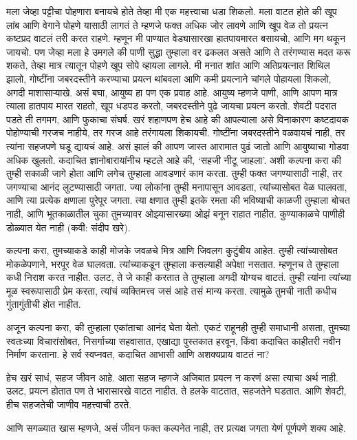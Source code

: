 मला जेव्हा पट्टीचा पोहणारा बनायचे होते तेव्हा मी एक महत्त्वाचा धडा शिकलो.  मला वाटत होते की खूप लांब आणि वेगाने पोहणे यासाठी लागतं ते म्हणजे फक्त अधिक जोर लावणे आणि खूप वेळ तो प्रयत्न कष्टप्रद वाटलं तरी करत राहणे. म्हणून मी पाण्यात वेड्यासारखा हातपायमारत बसायचो, आणि मग थकून जायचो. पण जेव्हा मला हे उमगले की पाणी सुद्धा  तुम्हाला वर ढकलत असते आणि ते तरंगण्यास मदत करू शकते, तेव्हा मात्र त्यातून पोहणे खूप सोपे व्हायला लागले. मी मनात शांत आणि अतिप्रयत्नात शिथिल झालो, गोष्टींना जबरदस्तीने करण्याचा प्रयत्न थांबवला आणि कमी प्रयत्नाने चांगले पोहायला शिकलो, अगदी माशासाऱ्याखे. 
असं बघा, आयुष्य हा पण एक प्रवाह आहे. आयुष्य म्हणजे पाणी, आणि आपण मात्र त्याला हातपाय मारत राहतो, खूप धडपड करतो, जबरदस्तीने पुढे जायचा प्रयत्न करतो. शेवटी पदरात पडते  ती तगमग, आणि फुकाचा संघर्ष. खरं शहाणपण हेच आहे की आपल्याला असे विनाकारण कष्टदायक पोहोण्याची गरजच नाहीये, तर गरज आहे तरंगायला शिकायची. गोष्टींना जबरदस्तीने वळवायचं नाही, तर त्यांना सहजपणे घडू द्यायचं आहे. असं झालं की आपण जास्त आरामात पुढं जातो आणि आयुष्याचा गोडवा अधिक खुलतो. कदाचित ज्ञानोबारायांनीच म्हटले आहे की, ‘सहजी नीटू जाहला’. 
अशी कल्पना करा की तुम्ही सकाळी जागे होता आणि लगेच तुम्हाला आवडणारं काम करता. तुम्ही फक्त जगण्यासाठी नाही, तर जगण्याचा आनंद लुटण्यासाठी जगता. ज्या लोकांना तुम्ही मनापासून आवडता, त्यांच्यासोबत वेळ घालवता, आणि त्या प्रत्येक क्षणाला पुरेपूर जगता. त्या क्षणात तुम्ही इतके रमता की भविष्याची काळजी तुम्हाला बोचत नाही, आणि भूतकाळातील चुका तुमच्यावर ओझ्यासारख्या ओझं बनून राहात नाहीत. कुण्याकाळचे पाणीही डोळ्यात येत नाही (कवी: संदीप खरे). 

कल्पना करा, तुमच्याकडे काही मोजके जवळचे मित्र आणि जिवलग कुटुंबीय आहेत. तुम्ही त्यांच्यासोबत मोकळेपणाने, भरपूर वेळ घालवता. त्यांच्याकडून तुम्हाला कसल्याही अपेक्षा नसतात. म्हणूनच ते तुम्हाला कधी निराश करत नाहीत. उलट, ते जे काही करतात ते तुम्हाला अगदी योग्यच वाटतं. तुम्ही त्यांना त्यांच्या मूळ स्वरूपासाठी प्रेम करता, त्यांचं व्यक्तिमत्त्व जसं आहे तसं मान्य करता. त्यामुळे तुमची नाती कधीच गुंतागुंतीची होत नाहीत.

अजून कल्पना करा, की तुम्हाला एकांताचा आनंद घेता येतो. एकटं राहूनही तुम्ही समाधानी असता, तुमच्या स्वतःच्या विचारांसोबत, निसर्गाच्या सहवासात, एखाद्या पुस्तकात हरवून, किंवा कदाचित काहीतरी नवीन निर्माण करताना. हे सर्व स्वप्नवत, कदाचित आभासी आणि अशक्यप्राय वाटतं  ना? 

हेच खरं साधं, सहज जीवन आहे. आता सहज म्हणजे अजिबात प्रयत्न न करणं असा त्याचा अर्थ नाही. उलट, प्रयत्न होतात पण ते भारासारखे वाटत नाहीत. ते हलके वाटतात, सहजतेने घडतात. आणि शेवटी, हीच सहजतेची जाणीव महत्त्वाची ठरते.

आणि सगळ्यात खास म्हणजे, असं जीवन फक्त कल्पनेत नाही, तर प्रत्यक्ष जगता येणं  पूर्णपणे शक्य आहे.


